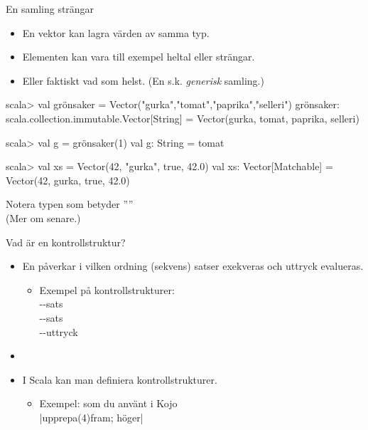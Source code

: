 \begin{Slide}{En samling strängar}

\begin{itemize}
\item En vektor kan lagra  värden av samma typ.
\item Elementen kan vara till exempel heltal eller strängar.
\item Eller faktiskt vad som helst. (En s.k. \emph{generisk} samling.)
\end{itemize}

\begin{REPL}
scala> val grönsaker = Vector("gurka","tomat","paprika","selleri")
grönsaker: scala.collection.immutable.Vector[String] =
  Vector(gurka, tomat, paprika, selleri)

scala> val g = grönsaker(1)
val g: String = tomat

scala> val xs = Vector(42, "gurka", true, 42.0)
val xs: Vector[Matchable] = Vector(42, gurka, true, 42.0)
\end{REPL}
\SlideFontSmall Notera typen  som betyder ''''\\
(Mer om  senare.)
\end{Slide}





\begin{Slide}{Vad är en kontrollstruktur?}
\begin{itemize}
\item En  påverkar i vilken ordning (sekvens) satser exekveras och uttryck evalueras.
\begin{itemize}
\item[] Exempel på  kontrollstrukturer:
\\\vspace{0.5em}--sats \\ --sats \\ --uttryck
\end{itemize}

\item[]

\item I Scala kan man definiera  kontrollstrukturer.
\begin{itemize}
\item[] Exempel:  som du använt i Kojo
\\\vspace{0.5em}\code|upprepa(4){fram; höger}|
\end{itemize}
\end{itemize}
\end{Slide}

